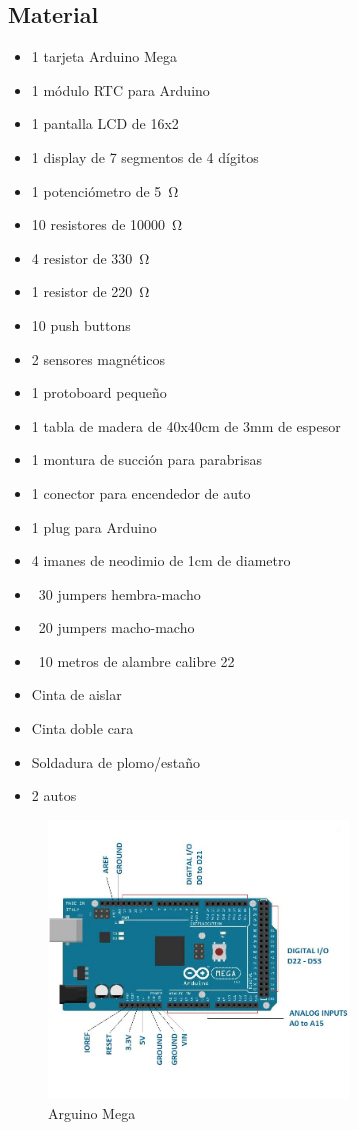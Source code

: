 \documentclass[a4paper,11pt]{article}
\begin{document}
\subsection*{Material}
\begin{itemize}
	\item 1 tarjeta Arduino Mega
	\item 1 módulo RTC para Arduino
	\item 1 pantalla LCD de 16x2
	\item 1 display de 7 segmentos de 4 dígitos
	\item 1 potenciómetro de \SI{5}{\ohm}
	\item 10 resistores de \SI{10000}{\ohm}
	\item 4 resistor de \SI{330}{\ohm}
	\item 1 resistor de \SI{220}{\ohm}
	\item 10 push buttons
	\item 2 sensores magnéticos
	\item 1 protoboard pequeño
	\item 1 tabla de madera de 40x40cm de 3mm de espesor 
	\item 1 montura de succión para parabrisas 
	\item 1 conector para encendedor de auto
	\item 1 plug para Arduino
	\item 4 imanes de neodimio de 1cm de diametro
	\item ~30 jumpers hembra-macho
	\item ~20 jumpers macho-macho
	\item ~10 metros de alambre calibre 22
	\item Cinta de aislar
	\item Cinta doble cara
	\item Soldadura de plomo/estaño
	\item 2 autos	
\end{itemize}

\begin{figure}[h]
\centering
\includegraphics[width=8cm]{images/Arduino.jpg}
\caption{Arguino Mega}
\end{figure}
\end{document}
